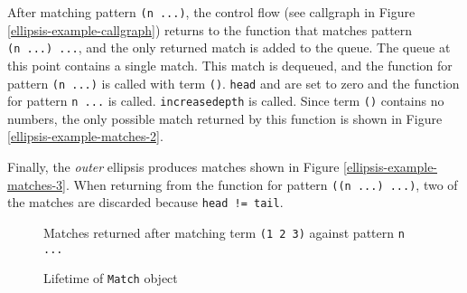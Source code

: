 After matching pattern \texttt{(n\ ...)}, the control flow (see callgraph in Figure \ref{ellipsis-example-callgraph}) returns to the function that matches pattern \texttt{(n\ ...)\ ...}, and the only returned match is added to the queue. The queue at this point contains a single match. This match is dequeued, and the function for pattern \texttt{(n\ ...)} is called with term \texttt{()}. \texttt{head} and  are set to zero and the function for pattern \texttt{n\ ...} is called. \texttt{increasedepth} is called. Since term \texttt{()} contains no numbers, the only possible match returned by this function is shown in Figure \ref{ellipsis-example-matches-2}.

Finally, the \textit{outer} ellipsis produces matches shown in Figure \ref{ellipsis-example-matches-3}. When returning from the function for pattern \texttt{((n\ ...)\ ...)}, two of the matches are discarded because \texttt{head != tail}.


\begin{figure}[!htb]
\caption{Matches returned after matching term \texttt{(1 2 3)} against pattern \texttt{n ...}}
\label{ellipsis-example-matches-1}
\end{figure}

\begin{figure}[H]
\caption{Lifetime of \texttt{Match} object}



\end{figure}

